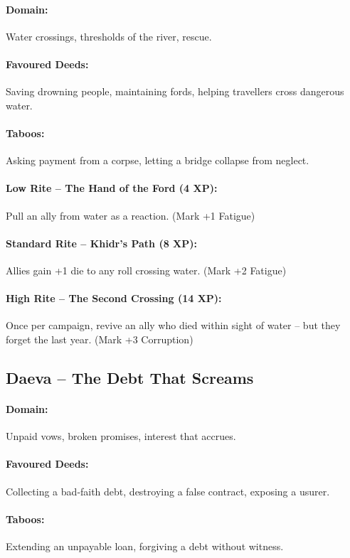 \documentclass[11pt]{book}
\begin{document}
\paragraph{Domain:} Water crossings, thresholds of the river, rescue.
\paragraph{Favoured Deeds:} Saving drowning people, maintaining fords, helping travellers cross dangerous water.
\paragraph{Taboos:} Asking payment from a corpse, letting a bridge collapse from neglect.
\paragraph{Low Rite -- The Hand of the Ford (4 XP):} Pull an ally from water as a reaction. (Mark +1 Fatigue)
\paragraph{Standard Rite -- Khidr’s Path (8 XP):} Allies gain +1 die to any roll crossing water. (Mark +2 Fatigue)
\paragraph{High Rite -- The Second Crossing (14 XP):} Once per campaign, revive an ally who died within sight of water – but they forget the last year. (Mark +3 Corruption)

\subsection{Daeva – The Debt That Screams}
\paragraph{Domain:} Unpaid vows, broken promises, interest that accrues.
\paragraph{Favoured Deeds:} Collecting a bad‑faith debt, destroying a false contract, exposing a usurer.
\paragraph{Taboos:} Extending an unpayable loan, forgiving a debt without witness.
\end{document}
